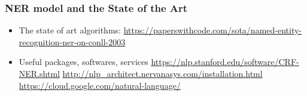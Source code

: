 \documentclass[notheorems, aspectratio=54]{beamer}
\begin{document}
\begin{frame}
\frametitle{NER model and the State of the Art}
\begin{itemize}
\item The state of art algorithms:
\url{https://paperswithcode.com/sota/named-entity-recognition-ner-on-conll-2003}
\item Useful packages, softwares, services
\url{https://nlp.stanford.edu/software/CRF-NER.shtml}
\url{http://nlp_architect.nervanasys.com/installation.html}
\url{https://cloud.google.com/natural-language/}

\end{itemize}


\end{frame}
\end{document}
